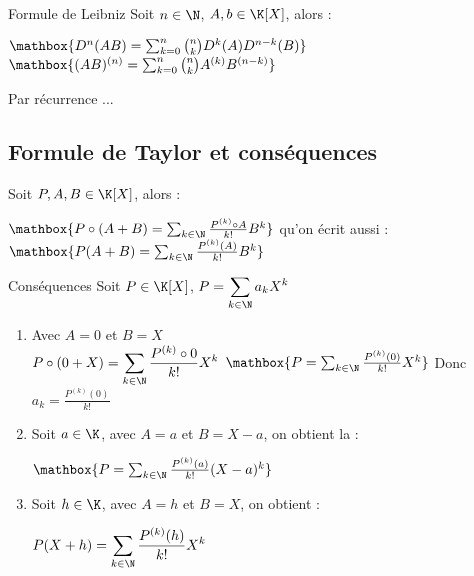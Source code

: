 \documentclass[12pt,a4paper]{report}
\begin{document}
\begin{theoreme}{Formule de Leibniz}{}
Soit $n\in \N$, $A,b \in \K[X]$, alors : 
\begin{center}
    $\mathbox{D^n (AB)=\sum^n_{k=0} {{n}\choose{k}} D^k (A) D^{n-k}(B)}$ \ie $\mathbox{(AB)^{(n)} = \sum^n_{k=0}  {{n}\choose{k}} A^{(k)} B^{(n-k)}}$
\end{center}
\end{theoreme}

\begin{principedemo}{}
Par récurrence ...
\end{principedemo}



\subsection{Formule de Taylor et conséquences}

\begin{theoreme}{}{}
Soit $P,A,B \in \K[X]$, alors : 
\begin{center}
    $\mathbox{P\circ (A+B) = \sum_{k\in \N} \frac{P^{(k)} \circ A}{k!} B^k}$ qu'on écrit aussi : $\mathbox{P(A+B)= \sum_{k\in \N} \frac{P^{(k)}(A)}{k!} B^k}$
\end{center}
\end{theoreme}

\begin{demo}

\end{demo}

\begin{propositions}{Conséquences}{}
Soit $P \in \K[X]$, $P = \displaystyle \sum_{k\in \N} a_k X^k$
\begin{enumerate}
    \item Avec $A=0$ et $B=X$\\
    $P \circ (0+X) = \displaystyle\sum_{k\in \N} \frac{P^{(k)} \circ 0}{k!} X^k$ \: \: \: \ie $\mathbox{P = \sum_{k\in \N} \frac{P^{(k)}(0)}{k!} X^k} $ Donc $a_k = \frac{P^{(k)} (0)}{k!}$
    
    \item Soit $a \in \K$, avec $A=a$ et $B=X-a$, on obtient la  : 
    \begin{center}
        $\mathbox{P = \sum_{k \in \N} \frac{P^{(k)}(a)}{k!} (X-a)^k}$
    \end{center}
    \item Soit $h \in \K$, avec $A=h$ et $B=X$, on obtient : 
    \begin{center}
        $P(X+h)= \displaystyle\sum_{k\in \N} \frac{P^{(k)}(h)}{k!} X^k$
    \end{center}
\end{enumerate}
\end{propositions}
\end{document}
